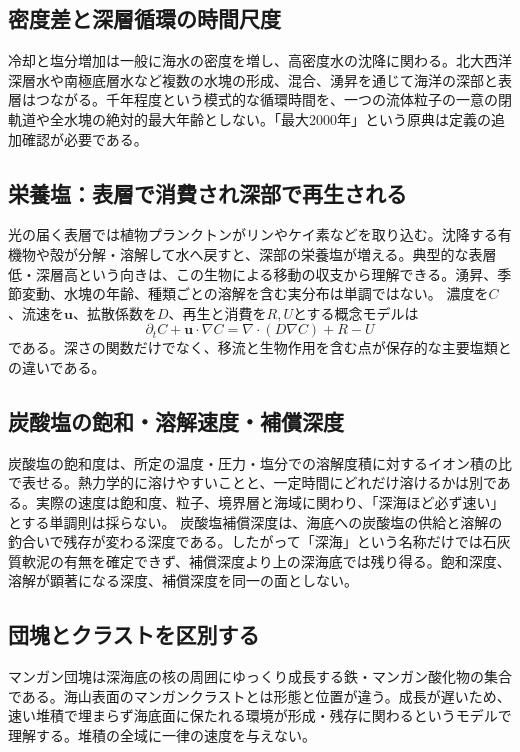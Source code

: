 \subsection{密度差と深層循環の時間尺度}
\label{theory:ocean:overturning}
冷却と塩分増加は一般に海水の密度を増し、高密度水の沈降に関わる。北大西洋深層水や南極底層水など複数の水塊の形成、混合、湧昇を通じて海洋の深部と表層はつながる。千年程度という模式的な循環時間を、一つの流体粒子の一意の閉軌道や全水塊の絶対的最大年齢としない。「最大2000年」という原典は定義の追加確認が必要である。\cite{noaa_overturning}

\subsection{栄養塩：表層で消費され深部で再生される}
\label{theory:ocean:nutrients}
光の届く表層では植物プランクトンがリンやケイ素などを取り込む。沈降する有機物や殻が分解・溶解して水へ戻すと、深部の栄養塩が増える。典型的な表層低・深層高という向きは、この生物による移動の収支から理解できる。湧昇、季節変動、水塊の年齢、種類ごとの溶解を含む実分布は単調ではない。\cite{noaa_nutrient_observations}
濃度を\(C\)、流速を\(\boldsymbol u\)、拡散係数を\(D\)、再生と消費を\(R,U\)とする概念モデルは
\[
 \partial_t C+\boldsymbol u\cdot\nabla C
 =\nabla\cdot(D\nabla C)+R-U
\]
である。深さの関数だけでなく、移流と生物作用を含む点が保存的な主要塩類との違いである。

\subsection{炭酸塩の飽和・溶解速度・補償深度}
\label{theory:ocean:carbonate}
炭酸塩の飽和度は、所定の温度・圧力・塩分での溶解度積に対するイオン積の比で表せる。熱力学的に溶けやすいことと、一定時間にどれだけ溶けるかは別である。実際の速度は飽和度、粒子、境界層と海域に関わり、「深海ほど必ず速い」とする単調則は採らない。\cite{feely_carbonate2004}
炭酸塩補償深度は、海底への炭酸塩の供給と溶解の釣合いで残存が変わる深度である。したがって「深海」という名称だけでは石灰質軟泥の有無を確定できず、補償深度より上の深海底では残り得る。飽和深度、溶解が顕著になる深度、補償深度を同一の面としない。\cite{noaa_ccd_definition,feely_carbonate2004}

\subsection{団塊とクラストを区別する}
\label{theory:ocean:nodules}
マンガン団塊は深海底の核の周囲にゆっくり成長する鉄・マンガン酸化物の集合である。海山表面のマンガンクラストとは形態と位置が違う。成長が遅いため、速い堆積で埋まらず海底面に保たれる環境が形成・残存に関わるというモデルで理解する。堆積の全域に一律の速度を与えない。\cite{jamstec_deep_resources}

